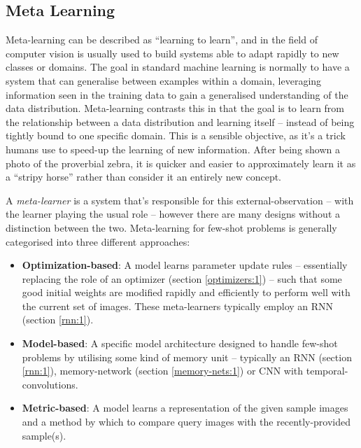 \documentclass{report}
\begin{document}
\subsection{Meta Learning}
Meta-learning can be described as ``learning to learn'', and in the field of computer vision is usually used to build systems able to adapt rapidly to new classes or domains. The goal in standard machine learning is normally to have a system that can generalise between examples within a domain, leveraging information seen in the training data to gain a generalised understanding of the data distribution. Meta-learning contrasts this in that the goal is to learn from the relationship between a data distribution and learning itself -- instead of being tightly bound to one specific domain. This is a sensible objective, as it's a trick humans use to speed-up the learning of new information. After being shown a photo of the proverbial zebra, it is quicker and easier to approximately learn it as a ``stripy horse'' rather than consider it an entirely new concept. \par
A \emph{meta-learner} is a system that's responsible for this external-observation -- with the learner playing the usual role -- however there are many designs without a distinction between the two. Meta-learning for few-shot problems is generally categorised into three different approaches:
\begin{itemize}
 \item \textbf{Optimization-based}: A model learns parameter update rules -- essentially replacing the role of an optimizer (section \ref{optimizers:1}) -- such that some good initial weights are modified rapidly and efficiently to perform well with the current set of images. These meta-learners typically employ an RNN (section \ref{rnn:1}).
 \item \textbf{Model-based}: A specific model architecture designed to handle few-shot problems by utilising some kind of memory unit -- typically an RNN (section \ref{rnn:1}), memory-network (section \ref{memory-nets:1}) or CNN with temporal-convolutions.
 \item \textbf{Metric-based}: A model learns a representation of the given sample images and a method by which to compare query images with the recently-provided sample(s).
\end{itemize}
\end{document}
